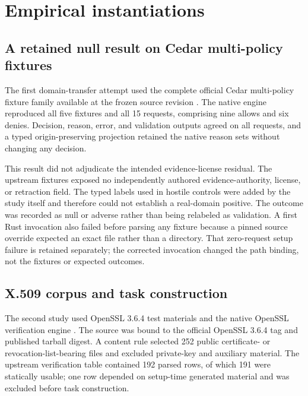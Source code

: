 \documentclass[pdflatex,sn-mathphys-num]{sn-jnl}
\begin{document}
\section{Empirical instantiations}\label{empirical-instantiations}

\subsection{A retained null result on Cedar multi-policy fixtures}\label{a-retained-null-result-on-cedar-multi-policy-fixtures}

The first domain-transfer attempt used the complete official Cedar multi-policy fixture family available at the frozen source revision \citep{cutler2024}. The native engine reproduced all five fixtures and all 15 requests, comprising nine allows and six denies. Decision, reason, error, and validation outputs agreed on all requests, and a typed origin-preserving projection retained the native reason sets without changing any decision.

This result did not adjudicate the intended evidence-license residual. The upstream fixtures exposed no independently authored evidence-authority, license, or retraction field. The typed labels used in hostile controls were added by the study itself and therefore could not establish a real-domain positive. The outcome was recorded as null or adverse rather than being relabeled as validation. A first Rust invocation also failed before parsing any fixture because a pinned source override expected an exact file rather than a directory. That zero-request setup failure is retained separately; the corrected invocation changed the path binding, not the fixtures or expected outcomes.

\subsection{X.509 corpus and task construction}\label{x.509-corpus-and-task-construction}

The second study used OpenSSL 3.6.4 test materials and the native OpenSSL verification engine \citep{openssl364, rfc5280}. The source was bound to the official OpenSSL 3.6.4 tag and published tarball digest. A content rule selected 252 public certificate- or revocation-list-bearing files and excluded private-key and auxiliary material. The upstream verification table contained 192 parsed rows, of which 191 were statically usable; one row depended on setup-time generated material and was excluded before task construction.
\end{document}

